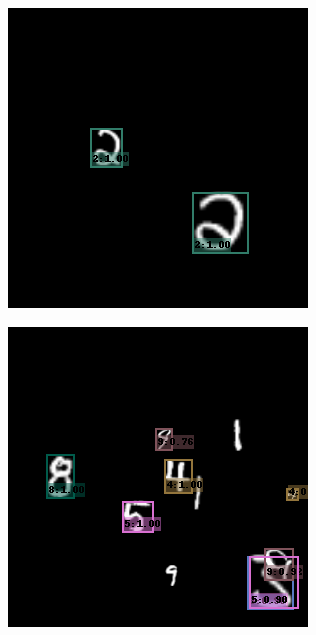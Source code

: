 \begin{figure}
  \centering
  \begin{subfigure}[b]{0.49\textwidth}
    \centering
    \includegraphics[width=\textwidth]{figures/0.png}
  \end{subfigure}
  \begin{subfigure}[b]{0.49\textwidth}
    \centering
    \includegraphics[width=\textwidth]{figures/1.png}

\end{subfigure}
\end{figure}
